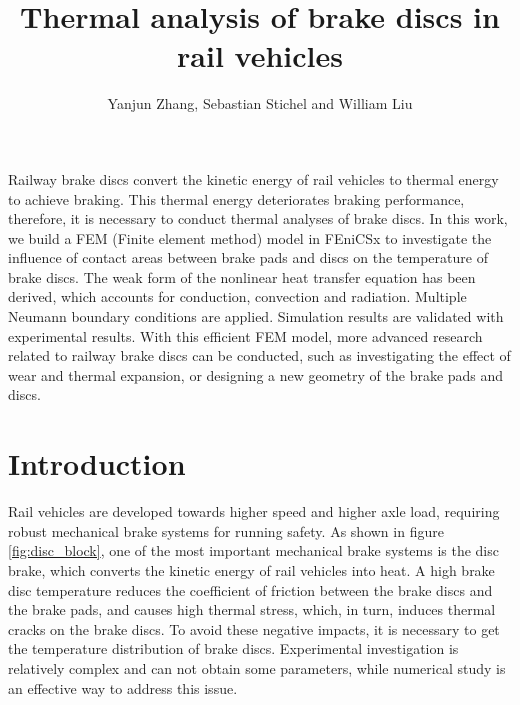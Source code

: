 \graphicspath{{chapters/zhang/graphics/}}


\title{Thermal analysis of brake discs in rail vehicles}

\author{Yanjun Zhang, Sebastian Stichel and William Liu}


\maketitle

\abstract{}
Railway brake discs convert the kinetic energy of rail vehicles to thermal energy to achieve braking. This thermal energy deteriorates braking performance, therefore, it is necessary to conduct thermal analyses of brake discs. In this work, we build a FEM (Finite element method) model in FEniCSx to investigate the influence of contact areas between brake pads and discs on the temperature of brake discs. The weak form of the nonlinear heat transfer equation has been derived, which accounts for conduction, convection and radiation. Multiple Neumann boundary conditions are applied. Simulation results are validated with experimental results. With this efficient FEM model, more advanced research related to railway brake discs can be conducted, such as investigating the effect of wear and thermal expansion, or designing a new geometry of the brake pads and discs.

\section*{Introduction}
Rail vehicles are developed towards higher speed and higher axle load, requiring robust mechanical brake systems for running safety. As shown in figure \ref{fig:disc_block}, one of the most important mechanical brake systems is the disc brake, which converts the kinetic energy of rail vehicles into heat. A high brake disc temperature reduces the coefficient of friction between the brake discs and the brake pads\cite{Saffar2010}, and causes high thermal stress, which, in turn, induces thermal cracks on the brake discs. To avoid these negative impacts, it is necessary to get the temperature distribution of brake discs. Experimental investigation is relatively complex and can not obtain some parameters, while numerical study is an effective way to address this issue.

